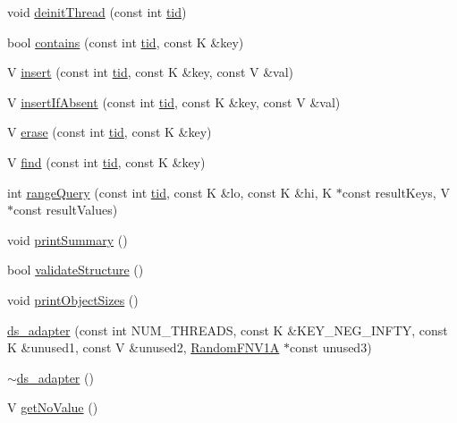 \begin{DoxyCompactItemize}
\item 
void \hyperlink{classds__adapter_a173ca48b19fc1dc346159ea582c690cd}{deinit\+Thread} (const int \hyperlink{microbench_2main_8cpp_a9ca9869868fe7e7a38a921cc7de4103f}{tid})
\item 
bool \hyperlink{classds__adapter_aecf1899dbe9fae93c72ee2b5549cf6eb}{contains} (const int \hyperlink{microbench_2main_8cpp_a9ca9869868fe7e7a38a921cc7de4103f}{tid}, const K \&key)
\item 
V \hyperlink{classds__adapter_a6c0fc676d77e30e14946baf325174739}{insert} (const int \hyperlink{microbench_2main_8cpp_a9ca9869868fe7e7a38a921cc7de4103f}{tid}, const K \&key, const V \&val)
\item 
V \hyperlink{classds__adapter_ae9cb29ad0c0338c0e1d12ef97e008135}{insert\+If\+Absent} (const int \hyperlink{microbench_2main_8cpp_a9ca9869868fe7e7a38a921cc7de4103f}{tid}, const K \&key, const V \&val)
\item 
V \hyperlink{classds__adapter_a1bf459e8449df93cc738a644aeffdcfb}{erase} (const int \hyperlink{microbench_2main_8cpp_a9ca9869868fe7e7a38a921cc7de4103f}{tid}, const K \&key)
\item 
V \hyperlink{classds__adapter_a0109b0d011810f687c9e9273eb1d1bc8}{find} (const int \hyperlink{microbench_2main_8cpp_a9ca9869868fe7e7a38a921cc7de4103f}{tid}, const K \&key)
\item 
int \hyperlink{classds__adapter_a23a9c8db5425e98a93d647df1c6c23dd}{range\+Query} (const int \hyperlink{microbench_2main_8cpp_a9ca9869868fe7e7a38a921cc7de4103f}{tid}, const K \&lo, const K \&hi, K $\ast$const result\+Keys, V $\ast$const result\+Values)
\item 
void \hyperlink{classds__adapter_aac97293215557665d2ef1e1a0d06fcfd}{print\+Summary} ()
\item 
bool \hyperlink{classds__adapter_ae50fe8a8683c0278cdd4c45e1405860d}{validate\+Structure} ()
\item 
void \hyperlink{classds__adapter_a33b13b7059a8c0345fb59a324dc3a691}{print\+Object\+Sizes} ()
\item 
\hyperlink{classds__adapter_a75376588d423be0fe462aa38b2fe7516}{ds\+\_\+adapter} (const int N\+U\+M\+\_\+\+T\+H\+R\+E\+A\+DS, const K \&K\+E\+Y\+\_\+\+N\+E\+G\+\_\+\+I\+N\+F\+TY, const K \&unused1, const V \&unused2, \hyperlink{classRandomFNV1A}{Random\+F\+N\+V1A} $\ast$const unused3)
\item 
\hyperlink{classds__adapter_a366f46dd39d59f2d4a147589f5fd98e3}{$\sim$ds\+\_\+adapter} ()
\item 
V \hyperlink{classds__adapter_a9e1e4aec136b351d1a6820d70484a6c5}{get\+No\+Value} ()

\end{DoxyCompactItemize}
